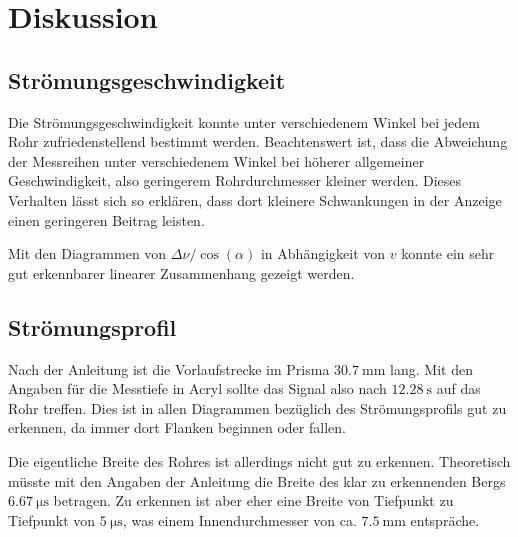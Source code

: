 \section{Diskussion}
\label{sec:Diskussion}

\subsection{Strömungsgeschwindigkeit}

Die Strömungsgeschwindigkeit konnte unter verschiedenem Winkel bei jedem Rohr
zufriedenstellend bestimmt werden. Beachtenswert ist, dass die Abweichung der
Messreihen unter verschiedenem Winkel bei höherer allgemeiner Geschwindigkeit,
also geringerem Rohrdurchmesser kleiner werden. Dieses Verhalten lässt sich so erklären,
dass dort kleinere Schwankungen in der Anzeige einen geringeren Beitrag leisten.

Mit den Diagrammen von $\Delta\nu / \cos(\alpha)$ in Abhängigkeit von
$v$ konnte ein sehr gut erkennbarer linearer Zusammenhang gezeigt werden.

\subsection{Strömungsprofil}

Nach der Anleitung ist die Vorlaufstrecke im Prisma $\SI{30.7}{\milli\meter}$
lang. Mit den Angaben für die Messtiefe in Acryl sollte das Signal also nach
$\SI{12.28}{\second}$ auf das Rohr treffen. Dies ist in allen Diagrammen bezüglich
des Strömungsprofils gut zu erkennen, da immer dort Flanken beginnen oder fallen.

Die eigentliche Breite des Rohres ist allerdings nicht gut zu erkennen. Theoretisch müsste
mit den Angaben der Anleitung die Breite des klar zu erkennenden Bergs $\SI{6.67}{\micro\second}$
betragen. Zu erkennen ist aber eher eine Breite von Tiefpunkt zu Tiefpunkt von
$\SI{5}{\micro\second}$, was einem Innendurchmesser von ca. $\SI{7.5}{\milli\meter}$
entspräche.

